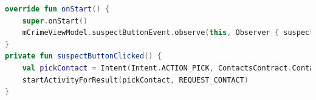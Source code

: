 \begin{lstlisting}[language=Kotlin,label=code:FragmentEvent,
caption={The \lstinline!Activities! or \lstinline!Fragments! observe the events from the  \lstinline!ViewModel!, and respond by creating a new \lstinline!Activity! or \lstinline!Fragment!}]
 override fun onStart() {
	super.onStart()
	mCrimeViewModel.suspectButtonEvent.observe(this, Observer { suspectButtonClicked() })
}
private fun suspectButtonClicked() {
	val pickContact = Intent(Intent.ACTION_PICK, ContactsContract.Contacts.CONTENT_URI)
	startActivityForResult(pickContact, REQUEST_CONTACT)
}
\end{lstlisting}